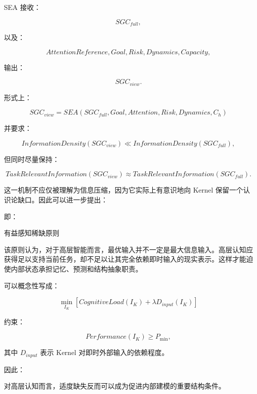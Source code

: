 SEA 接收：

\[
SGC_{full},
\]

以及：

\[
AttentionReference,
Goal,
Risk,
Dynamics,
Capacity,
\]

输出：

\[
SGC_{view}.
\]

形式上：

\[
\boxed{
SGC_{view}
=
SEA
\left(
SGC_{full},
Goal,
Attention,
Risk,
Dynamics,
C_h
\right)
}
\]

并要求：

\[
InformationDensity(SGC_{view})
\ll
InformationDensity(SGC_{full}),
\]

但同时尽量保持：

\[
TaskRelevantInformation(SGC_{view})
\approx
TaskRelevantInformation(SGC_{full}).
\]

这一机制不应仅被理解为信息压缩，因为它实际上有意识地向 Kernel 保留一个认识论缺口。因此可以进一步提出：

\begin{statementbox}
\centering
{}
\end{statementbox}

即：

\begin{statementbox}
有益感知稀缺原则
\end{statementbox}

该原则认为，对于高层智能而言，最优输入并不一定是最大信息输入。高层认知应获得足以支持当前任务，却不足以让其完全依赖即时输入的现实表示。这样才能迫使内部状态承担记忆、预测和结构抽象职责。

可以概念性写成：

\[
\min_{I_K}
\left[
CognitiveLoad(I_K)
+
\lambda D_{input}(I_K)
\right]
\]

约束：

\[
Performance(I_K)\ge P_{\min},
\]

其中 $D_{input}$ 表示 Kernel 对即时外部输入的依赖程度。

因此：

\begin{statementbox}
\centering
{}
\end{statementbox}

对高层认知而言，适度缺失反而可以成为促进内部建模的重要结构条件。

